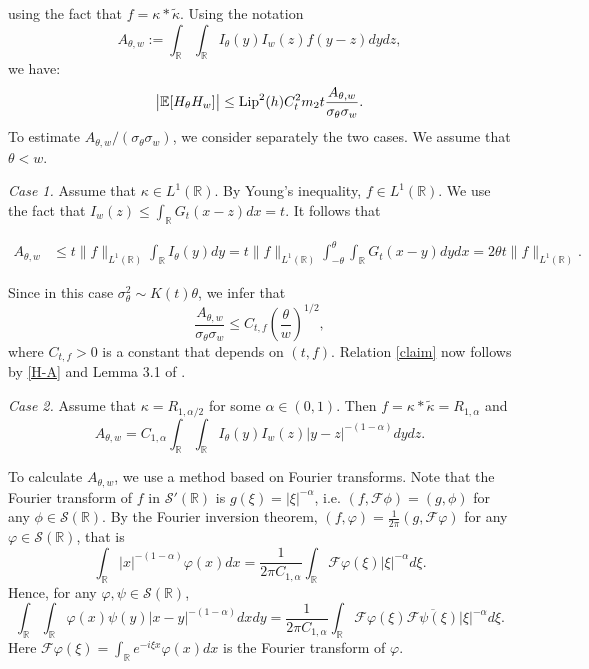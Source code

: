 \documentclass[12pt]{article}
\def\cF{\mathcal{F}}
\def\cS{\mathcal{S}}
\def\bE{\mathbb{E}}
\def\bR{\mathbb{R}}
\def\k{\kappa}
\newcommand{\lipf}{h}
\newcommand{\kerf}{f}
\begin{document}
using the fact that $\kerf=\kappa * \widetilde{\kappa}$. Using the notation
\[
A_{\theta,w}:=\int_{\bR}\int_{\bR} I_{\theta}(y) I_w(z)\kerf(y-z)dydz,
\]
we have:
\begin{equation}
\label{H-A}
\big|\bE[H_{\theta}H_w]\big| \leq {\rm Lip}^2(\lipf) C_t^2 m_2 t \frac{A_{\theta,w}}{\sigma_{\theta} \sigma_{w}}.
\end{equation}
To estimate $A_{\theta,w}/(\sigma_{\theta}\sigma_w)$, we consider separately the two cases. We assume that $\theta<w$.

\medskip

{\em Case 1.} Assume that $\kappa \in L^1(\bR)$. By Young's inequality, $\kerf \in L^1(\bR)$. We use the fact that $I_{w}(z)\leq \int_{\bR}G_t(x-z)dx=t$. It follows that

\begin{align*}
A_{\theta,w} & \leq  t\|\kerf\|_{L^1(\bR)}
\int_{\bR}I_{\theta}(y)  dy= t \|\kerf\|_{L^1(\bR)}
\int_{-\theta}^{\theta} \int_{\bR} G_t(x-y) dy dx
=2\theta t \|\kerf\|_{L^1(\bR)}.
\end{align*}

Since in this case $\sigma_{\theta}^2 \sim K(t) \theta$, we infer that
\[
\frac{A_{\theta,w}}{\sigma_{\theta}\sigma_{w}}  \leq  C_{t,\kerf} \left(\frac{\theta}{w}\right)^{1/2},
\]
where $C_{t,\kerf}>0$ is a constant that depends on $(t,\kerf)$. Relation \eqref{claim} now follows by \eqref{H-A} and Lemma 3.1 of \cite{BXZ}.

\medskip


{\em Case 2.} Assume that $\k=R_{1,\alpha/2}$ for some $\alpha \in (0,1)$. Then $\kerf=\kappa * \tilde{\kappa}=R_{1,\alpha}$ and
\[
A_{\theta,w}=C_{1,\alpha}\int_{\bR} \int_{\bR}I_{\theta}(y) I_{w}(z)|y-z|^{-(1-\alpha)}dydz.
\]


To calculate $A_{\theta,w}$, we use a method based on Fourier transforms. 
Note that the Fourier transform of $\kerf$ in $\cS'(\bR)$ is $g(\xi)=|\xi|^{-\alpha}$, i.e. $(\kerf,\cF \phi)=(g,\phi)$ for any $\phi \in \cS(\bR)$. By the Fourier inversion theorem,
$(\kerf,\varphi)=\frac{1}{2\pi}(g,\cF \varphi)$ for any $\varphi \in \cS(\bR)$, that is
\[
\int_{\bR}|x|^{-(1-\alpha)} \varphi(x)dx=\frac{1}{2\pi C_{1,\alpha} }\int_{\bR}\cF \varphi(\xi)|\xi|^{-\alpha}d\xi.
\]
Hence, for any $\varphi,\psi \in \cS(\bR)$,
\begin{equation}
\label{id1}
\int_{\bR}\int_{\bR}\varphi(x)\psi(y)|x-y|^{-(1-\alpha)}dxdy=\frac{1}{2\pi C_{1,\alpha} } \int_{\bR}\cF \varphi (\xi)\overline{\cF \psi(\xi)}|\xi|^{-\alpha}d\xi.
\end{equation}
Here $\cF \varphi(\xi)=\int_{\bR}e^{-i \xi x}\varphi(x)dx$ is the Fourier transform of $\varphi$.
\end{document}
